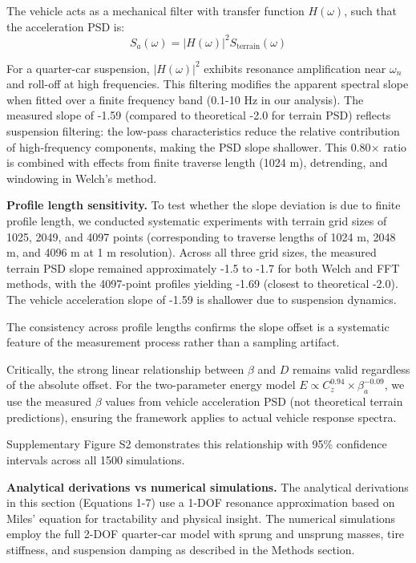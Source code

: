 \documentclass[11pt]{article}
\begin{document}
The vehicle acts as a mechanical filter with transfer function $H(\omega)$, such that the acceleration PSD is:
\begin{equation}
S_a(\omega) = |H(\omega)|^2 S_{\text{terrain}}(\omega)
\end{equation}

For a quarter-car suspension, $|H(\omega)|^2$ exhibits resonance amplification near $\omega_n$ and roll-off at high frequencies. This filtering modifies the apparent spectral slope when fitted over a finite frequency band (0.1-10 Hz in our analysis). The measured slope of -1.59 (compared to theoretical -2.0 for terrain PSD) reflects suspension filtering: the low-pass characteristics reduce the relative contribution of high-frequency components, making the PSD slope shallower. This 0.80$\times$ ratio is combined with effects from finite traverse length (1024 m), detrending, and windowing in Welch's method.

\textbf{Profile length sensitivity.} To test whether the slope deviation is due to finite profile length, we conducted systematic experiments with terrain grid sizes of 1025, 2049, and 4097 points (corresponding to traverse lengths of 1024 m, 2048 m, and 4096 m at 1 m resolution). Across all three grid sizes, the measured terrain PSD slope remained approximately -1.5 to -1.7 for both Welch and FFT methods, with the 4097-point profiles yielding -1.69 (closest to theoretical -2.0). The vehicle acceleration slope of -1.59 is shallower due to suspension dynamics. 

The consistency across profile lengths confirms the slope offset is a systematic feature of the measurement process rather than a sampling artifact.

Critically, the strong linear relationship between $\beta$ and $D$ remains valid regardless of the absolute offset. For the two-parameter energy model $E \propto C_z^{0.94} \times \beta_a^{-0.09}$, we use the measured $\beta$ values from vehicle acceleration PSD (not theoretical terrain predictions), ensuring the framework applies to actual vehicle response spectra. 

Supplementary Figure S2 demonstrates this relationship with 95\% confidence intervals across all 1500 simulations.

\textbf{Analytical derivations vs numerical simulations.} The analytical derivations in this section (Equations 1-7) use a 1-DOF resonance approximation based on Miles' equation for tractability and physical insight. The numerical simulations employ the full 2-DOF quarter-car model with sprung and unsprung masses, tire stiffness, and suspension damping as described in the Methods section. 
\end{document}
